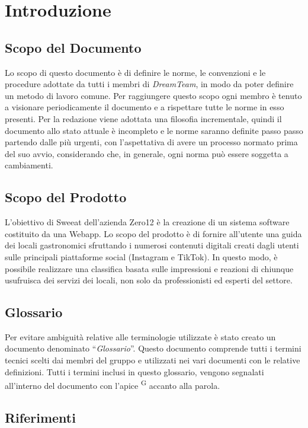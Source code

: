 \section{Introduzione}

\subsection{Scopo del Documento}
Lo scopo di questo documento è di definire le norme, le convenzioni e le procedure adottate da tutti i membri di \textit{DreamTeam}, in modo da poter definire un metodo di lavoro comune.
Per raggiungere questo scopo ogni membro è tenuto a visionare periodicamente il documento e a rispettare tutte le norme in esso presenti. 
Per la redazione viene adottata una filosofia incrementale, quindi il documento allo stato attuale è incompleto e le norme saranno definite passo passo partendo dalle più urgenti, con l'aspettativa di avere un processo normato prima del suo avvio, considerando che, in generale, ogni norma può essere soggetta a cambiamenti.


\subsection{Scopo del Prodotto}
L’obiettivo di Sweeat dell’azienda Zero12 è la creazione di un sistema software costituito da una Webapp. Lo scopo del prodotto è di fornire all’utente una guida dei locali gastronomici sfruttando i numerosi contenuti digitali creati dagli utenti sulle principali piattaforme social (Instagram e TikTok). In questo modo, è possibile realizzare una classifica basata sulle impressioni e reazioni di chiunque usufruisca dei servizi dei locali, non solo da professionisti ed esperti del settore.


\subsection{Glossario}
Per evitare ambiguità relative alle terminologie utilizzate è stato creato un documento denominato “\textit{Glossario}”. Questo documento comprende tutti i termini tecnici scelti dai membri del gruppo e utilizzati nei vari documenti con le relative definizioni. Tutti i termini inclusi in questo glossario, vengono segnalati all'interno del documento con l'apice \textsuperscript{G} accanto alla parola.

\subsection{Riferimenti}
